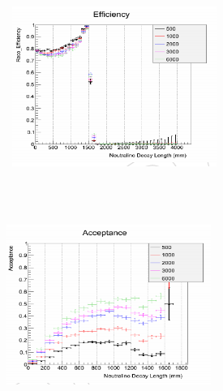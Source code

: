 \begin{minipage}{0.90\linewidth} 
\begin{center}
\mbox{
\includegraphics[height=7cm, width=0.5\textwidth]{THESISPLOTS/SignalReconstructionEfficiency.png}
\includegraphics[height=7cm, width=0.5\textwidth]{THESISPLOTS/SignalReconstructionAcceptance.png}
}
\label{fig:EffAcc}
\end{center}
\end{minipage}

